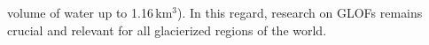 volume of water up to 1.16\,km$^3$). In this regard, research on GLOFs remains crucial and relevant for all glacierized regions of the world.  







